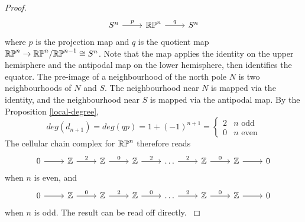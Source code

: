 \begin{proof}
\[\begin{tikzcd}
S^n \arrow[r, "p"] & \RP{n} \arrow[r, "q"] & S^n
\end{tikzcd}\]
where $p$ is the projection map and $q$ is the quotient map $\mathbb{RP}^{n}\rightarrow \mathbb{RP}^{n}/\mathbb{RP}^{n-1}\cong S^{n}$. Note that the map applies the identity on the upper hemisphere and the antipodal map on the lower hemisphere, then identifies the equator. The pre-image of a neighbourhood of the north pole $N$ is two neighbourhoods of $N$ and $S$. The neighbourhood near $N$ is mapped via the identity, and the neighbourhood near $S$ is mapped via the antipodal map. By the Proposition \ref{local-degree}, $$deg(d_{n+1})=deg(qp)=1+(-1)^{n+1}=\begin{cases}2 & n \text{ odd}\\0 & n\text{ even}\end{cases}$$
The cellular chain complex for $\mathbb{RP}^{n}$ therefore reads
\[\begin{tikzcd}
0 \arrow[r] & \mathbb{Z} \arrow[r, "2"] & \mathbb{Z} \arrow[r, "0"] & \mathbb{Z} \arrow[r, "2"] & \dots \arrow[r, "2"] & \mathbb{Z} \arrow[r, "0"] & \mathbb{Z} \arrow[r] & 0
\end{tikzcd}\]
when $n$ is even, and
\[\begin{tikzcd}
0 \arrow[r] & \mathbb{Z} \arrow[r, "0"] & \mathbb{Z} \arrow[r, "2"] & \mathbb{Z} \arrow[r, "0"] & \dots \arrow[r, "2"] & \mathbb{Z} \arrow[r, "0"] & \mathbb{Z} \arrow[r] & 0
\end{tikzcd}\]
when $n$ is odd. The result can be read off directly.
\cite{Hatcher}
\end{proof}
